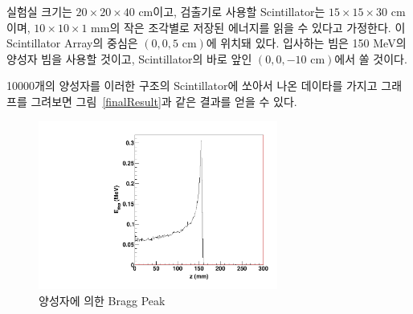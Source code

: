 실험실 크기는 $20\times20\times40$ cm이고, 검출기로 사용할 Scintillator는
$15\times15\times30$ cm이며, $10\times10\times1$ mm의 작은 조각별로 저장된
에너지를 읽을 수 있다고 가정한다. 이 Scintillator Array의 중심은 $(0, 0, 5
\text{ cm})$에 위치돼 있다. 입사하는 빔은 150 MeV의 양성자 빔을 사용할 것이고,
Scintillator의 바로 앞인 $(0, 0, -10 \text{ cm})$에서 쏠 것이다.

10000개의 양성자를 이러한 구조의 Scintillator에 쏘아서 나온 데이타를 가지고
그래프를 그려보면 그림~\eqref{finalResult}과 같은 결과를 얻을
수 있다.

\begin{figure}[h]
\centering\includegraphics[width=0.7\textwidth]{tex/finalResult.pdf}
\centering\caption{양성자에 의한 Bragg Peak \label{finalResult}}
\end{figure}
